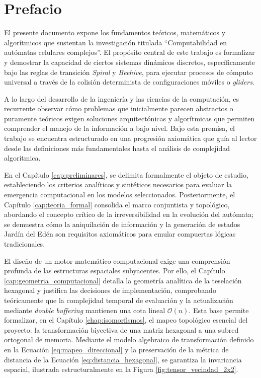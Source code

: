 %
%


\chapter*{Prefacio}

El presente documento expone los fundamentos teóricos, matemáticos y algorítmicos que sustentan la investigación titulada ``Computabilidad en autómatas celulares complejos''. El propósito central de este trabajo es formalizar y demostrar la capacidad de ciertos sistemas dinámicos discretos, específicamente bajo las reglas de transición \textit{Spiral} y \textit{Beehive}, para ejecutar procesos de cómputo universal a través de la colisión determinista de configuraciones móviles o \textit{gliders}. 

A lo largo del desarrollo de la ingeniería y las ciencias de la computación, es recurrente observar cómo problemas que inicialmente parecen abstractos o puramente teóricos exigen soluciones arquitectónicas y algorítmicas que permiten comprender el manejo de la información a bajo nivel. Bajo esta premisa, el trabajo se encuentra estructurado en una progresión axiomática que guía al lector desde las definiciones más fundamentales hasta el análisis de complejidad algorítmica.

En el Capítulo \ref{cap:preliminares}, se delimita formalmente el objeto de estudio, estableciendo los criterios analíticos y sintéticos necesarios para evaluar la emergencia computacional en los modelos seleccionados. Posteriormente, el Capítulo \ref{cap:teoria_formal} consolida el marco conjuntista y topológico, abordando el concepto crítico de la irreversibilidad en la evolución del autómata; se demuestra cómo la aniquilación de información y la generación de estados Jardín del Edén son requisitos axiomáticos para emular compuertas lógicas tradicionales.

El diseño de un motor matemático computacional exige una comprensión profunda de las estructuras espaciales subyacentes. Por ello, el Capítulo \ref{cap:geometria_computacional} detalla la geometría analítica de la teselación hexagonal y justifica las decisiones de implementación, comprobando teóricamente que la complejidad temporal de evaluación y la actualización mediante \textit{double buffering} mantienen una cota lineal $\mathcal{O}(n)$. Esta base permite formalizar, en el Capítulo \ref{chap:isomorfismos}, el mapeo topológico esencial del proyecto: la transformación biyectiva de una matriz hexagonal a una subred ortogonal de memoria. Mediante el modelo algebraico de transformación definido en la Ecuación \eqref{eq:mapeo_direccional} y la preservación de la métrica de distancia de la Ecuación \eqref{eq:distancia_hexagonal}, se garantiza la invariancia espacial, ilustrada estructuralmente en la Figura \ref{fig:tensor_vecindad_2x2}.

